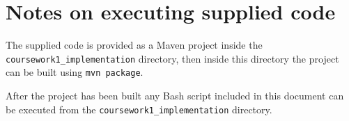 \appendix
\section{Notes on executing supplied code}

The supplied code is provided as a Maven project inside the
\texttt{coursework1\_implementation} directory, then inside this directory the
project can be built using \texttt{mvn package}.

After the project has been built any Bash script included in this document can
be executed from the \texttt{coursework1\_implementation} directory.
